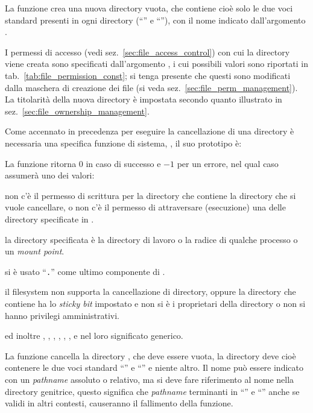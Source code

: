 La funzione crea una nuova directory vuota, che contiene cioè solo le due voci
standard presenti in ogni directory (``'' e ``''), con il
nome indicato dall'argomento . 

I permessi di accesso (vedi sez.~\ref{sec:file_access_control}) con cui la
directory viene creata sono specificati dall'argomento , i cui
possibili valori sono riportati in tab.~\ref{tab:file_permission_const}; si
tenga presente che questi sono modificati dalla maschera di creazione dei file
(si veda sez.~\ref{sec:file_perm_management}).  La titolarità della nuova
directory è impostata secondo quanto illustrato in
sez.~\ref{sec:file_ownership_management}.

Come accennato in precedenza per eseguire la cancellazione di una directory è
necessaria una specifica funzione di sistema, , il suo prototipo
è:

\begin{funcproto}{
}
{La funzione ritorna $0$ in caso di successo e $-1$ per un errore, nel qual
  caso  assumerà uno dei valori: 
  \begin{errlist}
  \item[\errcode{EACCES}] non c'è il permesso di scrittura per la directory
    che contiene la directory che si vuole cancellare, o non c'è il permesso
    di attraversare (esecuzione) una delle directory specificate in
    .
  \item[\errcode{EBUSY}] la directory specificata è la directory di lavoro o
    la radice di qualche processo o un \textit{mount point}.
  \item[\errcode{EINVAL}] si è usato ``\texttt{.}'' come ultimo componente
    di .
  \item[\errcode{EPERM}] il filesystem non supporta la cancellazione di
    directory, oppure la directory che contiene  ha lo
    \textit{sticky bit} impostato e non si è i proprietari della directory o
    non si hanno privilegi amministrativi.
  \end{errlist}
  ed inoltre , , ,
  , , ,  e
   nel loro significato generico.}
\end{funcproto}


La funzione cancella la directory , che deve essere vuota, la
directory deve cioè contenere le due voci standard ``'' e
``'' e niente altro.  Il nome può essere indicato con un
\textit{pathname} assoluto o relativo, ma si deve fare riferimento al nome
nella directory genitrice, questo significa che \textit{pathname} terminanti
in ``'' e ``'' anche se validi in altri contesti, causeranno
il fallimento della funzione.

